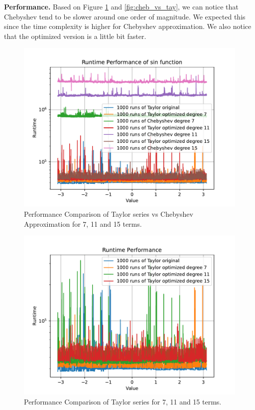 \documentclass[12pt]{article}
\begin{document}
\textbf{Performance.}
Based on Figure \ref{fig:perf_inc} and \ref{fig:cheb_vs_tay}, we can notice that Chebyshev tend to be slower around one order of magnitude.
We expected this since the time complexity is higher for Chebyshev approximation.
We also notice that the optimized version is a little bit faster.
\begin{figure}[h]
    \centering
    \includegraphics[width=\textwidth]{plots/performance/inc_rel_pi_001.pdf}
    \caption{Performance Comparison of Taylor series vs Chebyshev Approximation for 7, 11 and 15 terms.}
    \label{fig:perf_inc}
  \end{figure}

\begin{figure}[h]
    \centering
    \includegraphics[width=\textwidth]{plots/performance/inc_rel_pi_tay_orig_vs_opt.pdf}
    \caption{Performance Comparison of Taylor series for 7, 11 and 15 terms.}
    \label{fig:perf_orig_opt}
\end{figure}
\end{document}
